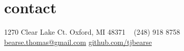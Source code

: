 \section{contact}
1270 Clear Lake Ct.
Oxford, MI 48371
~
(248) 918 8758
~
\href{mailto:bearse.thomas@gmail.com}{bearse.thomas@gmail.com}
\href{https://github.com/tjbearse}{github.com/tjbearse}
